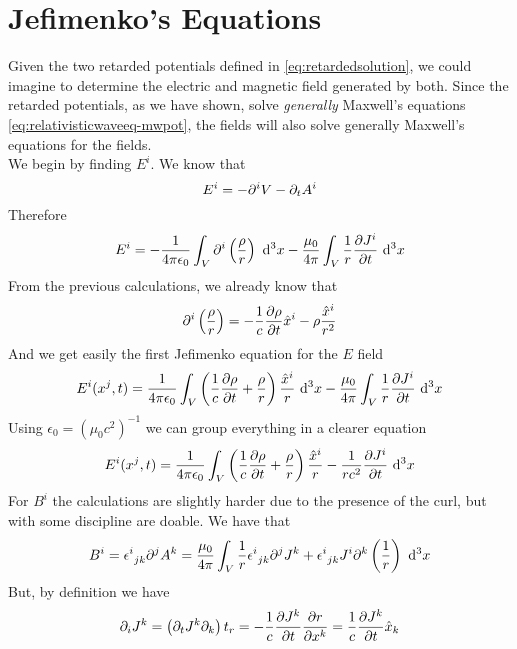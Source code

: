 \documentclass[../electromagnetism.tex]{subfiles}
\begin{document}
\section{Jefimenko's Equations}
Given the two retarded potentials defined in \eqref{eq:retardedsolution}, we could imagine to determine the electric and magnetic field generated by both. Since the retarded potentials, as we have shown, solve \textit{generally} Maxwell's equations \eqref{eq:relativisticwaveeq-mwpot}, the fields will also solve generally Maxwell's equations for the fields.\\
We begin by finding $E^i$. We know that
\begin{equation*}
	E^i=-\partial^iV-\partial_tA^i
\end{equation*}
Therefore
\begin{equation}
	E^i=-\frac{1}{4\pi\epsilon_0}\int_{V}^{}\partial^i\left( \frac{\rho}{r} \right)\ \mathrm{d}^{3}{x}-\frac{\mu_0}{4\pi}\int_{V}^{}\frac{1}{r}\pdv{J^i}{t}\ \mathrm{d}^{3}{x}
	\label{eq:Efieldimenko}
\end{equation}
From the previous calculations, we already know that
\begin{equation*}
	\partial^i\left( \frac{\rho}{r} \right)=-\frac{1}{c}\pdv{\rho}{t}\hat{x}^i-\rho\frac{\hat{x}^i}{r^2}
\end{equation*}
And we get easily the first Jefimenko equation for the $E$ field
\begin{equation*}
	E^i(x^j,t)=\frac{1}{4\pi\epsilon_0}\int_{V}^{}\left( \frac{1}{c}\pdv{\rho}{t}+\frac{\rho}{r} \right)\frac{\hat{x}^i}{r}\ \mathrm{d}^{3}{x}-\frac{\mu_0}{4\pi}\int_{V}^{}\frac{1}{r}\pdv{J^i}{t}\ \mathrm{d}^{3}{x}
\end{equation*}
Using $\epsilon_0=(\mu_0c^2)^{-1}$ we can group everything in a clearer equation
\begin{equation}
	E^i(x^j,t)=\frac{1}{4\pi\epsilon_0}\int_{V}^{}\left( \frac{1}{c}\pdv{\rho}{t}+\frac{\rho}{r} \right)\frac{\hat{x}^i}{r}-\frac{1}{rc^2}\pdv{J^i}{t}\ \mathrm{d}^{3}{x}
	\label{eq:Efimenko}
\end{equation}
For $B^i$ the calculations are slightly harder due to the presence of the curl, but with some discipline are doable. We have that
\begin{equation*}
	B^i=\epsilon^{i}_{\ jk}\partial^jA^k=\frac{\mu_0}{4\pi}\int_{V}^{}\frac{1}{r}\epsilon^{i}_{\ jk}\partial^jJ^k+\epsilon^{i}_{\ jk}J^i\partial^k\left( \frac{1}{r} \right)\ \mathrm{d}^{3}{x}
\end{equation*}
But, by definition we have
\begin{equation*}
	\partial_iJ^k=\left( \partial_tJ^k\partial_k \right)t_r=-\frac{1}{c}\pdv{J^k}{t}\pdv{r}{x^k}=\frac{1}{c}\pdv{J^k}{t}\hat{x}_k
\end{equation*}
\end{document}
